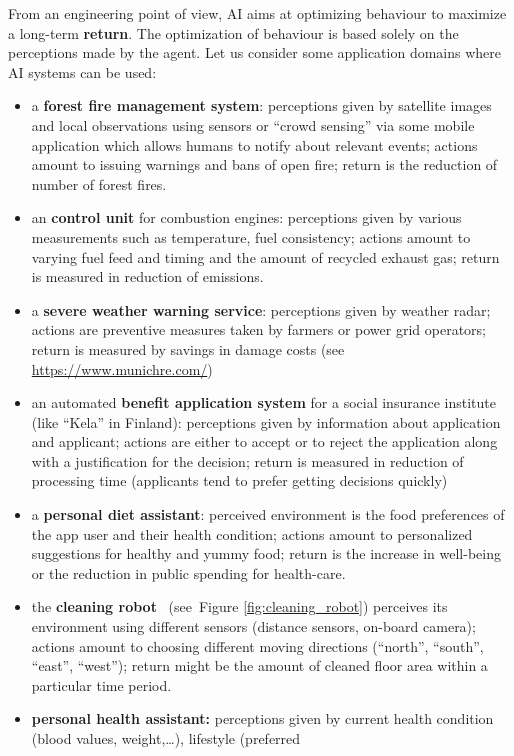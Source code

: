 \documentclass[12pt]{report}
\begin{document}
From an engineering point of view, AI aims at optimizing behaviour to 
maximize a long-term {\bf return}. The optimization of behaviour is based 
solely on the perceptions made by the agent. Let us consider some 
application domains where AI systems can be used:
\begin{itemize}
\item a {\bf forest fire management system}: perceptions given by 
satellite images and local observations using sensors or ``crowd sensing'' 
via some mobile application which allows humans to notify about 
relevant events; actions amount to issuing warnings and bans of 
open fire; return is the reduction of number of forest fires. 
\item an {\bf control unit} for combustion engines: 
perceptions given by various measurements such as temperature, 
fuel consistency; actions amount to varying fuel feed and timing 
and the amount of recycled exhaust gas; return is measured in 
reduction of emissions.   
\item a {\bf severe weather warning service}: perceptions given by 
weather radar; actions are preventive measures taken by farmers or 
power grid operators; return is measured by savings in damage 
costs (see \url{https://www.munichre.com/})
\item an automated {\bf benefit application system} for a social 
insurance institute (like ``Kela'' in Finland): perceptions given by 
information about application and applicant; actions are either to 
accept or to reject the application along with a justification for the 
decision; return is measured in reduction of processing time 
(applicants tend to prefer getting decisions quickly)
\item  a {\bf personal diet assistant}: perceived environment is the 
food preferences of the app user and their health condition; actions 
amount to personalized suggestions for healthy and yummy food;  
return is the increase in well-being or the reduction in public spending 
for health-care.  
\item the {\bf cleaning robot} \rumba\, (see\ Figure \ref{fig:cleaning_robot}) 
perceives its environment using different sensors (distance sensors, 
on-board camera); actions amount to choosing different moving 
directions (``north'', ``south'', ``east'', ``west''); return might be the 
amount of cleaned floor area within a particular time period. 
\item {\bf personal health assistant:}  perceptions given by current 
health condition (blood values, weight,\ldots), lifestyle (preferred 

\end{itemize}
\end{document}
